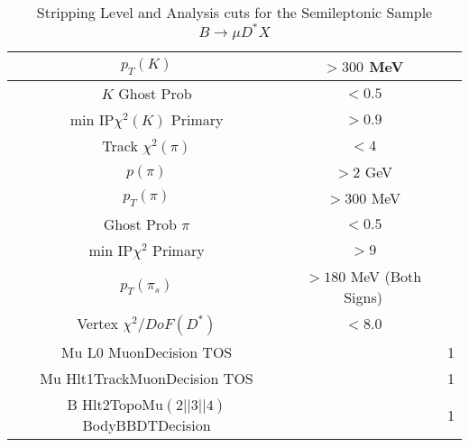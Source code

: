 \documentclass[11pt]{article}%
\begin{document}
\begin{flushleft}
\begin{linenumbers}
\begin{table}[htdp]
\begin{center}
\begin{tabular}{c c c }
			$p_T(K)$ & $>300$ MeV & \\ \hline
			$K$ Ghost Prob &$<0.5$ & \\ \hline 
			min IP$\chi^2(K)$ Primary & $>0.9$ & \\ \hline
			Track $\chi^2(\pi)$ &$<4$ &  \\ \hline
			$p(\pi)$ &$> 2$ GeV& \\ \hline
			$p_T(\pi)$ &$> 300$ MeV& \\ \hline
			Ghost Prob $\pi$ & $<0.5$ & \\ \hline
			min IP$\chi^2$ Primary & $>9$& \\ \hline
			$p_T(\pi_s)$ & $>180$ MeV (Both Signs)& \\ \hline
			Vertex $\chi^2/DoF(D^*)$ &$ <8.0$ & \\ 
			\hline
			Mu L0 MuonDecision TOS & & 1\\ \hline
			Mu Hlt1TrackMuonDecision TOS & & 1\\ \hline
			B Hlt2TopoMu$(2||3||4)$BodyBBDTDecision & & 1\\
			\hline\hline
		\end{tabular}
	\end{center}
	\caption{Stripping Level and Analysis cuts for the Semileptonic Sample $B\to\mu D^* X$}
	\label{table:B2MuXAnalysisCuts}
\end{table}



\end{linenumbers}
\end{flushleft}
\end{document}
